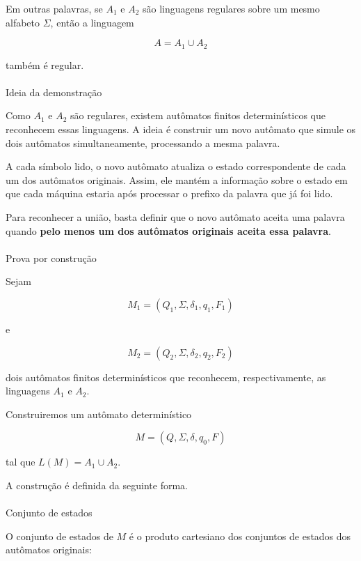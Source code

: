 \documentclass[
  brazilian,
  letterpaper,
]{book}
\makeatletter
\let\oldparagraph\paragraph
\renewcommand{\paragraph}{
    \@ifstar
      \xxxParagraphStar
      \xxxParagraphNoStar
  }
\newcommand{\xxxParagraphStar}[1]{\oldparagraph*{#1}\mbox{}}
\newcommand{\xxxParagraphNoStar}[1]{\oldparagraph{#1}\mbox{}}
\theoremstyle{plain}
\theoremstyle{definition}
\theoremstyle{remark}
\makeatother
\begin{document}
Em outras palavras, se \(A_1\) e \(A_2\) são linguagens regulares sobre
um mesmo alfabeto \(\Sigma\), então a linguagem

\[
A = A_1 \cup A_2
\]

também é regular.

\paragraph{Ideia da demonstração}\label{ideia-da-demonstrauxe7uxe3o}

Como \(A_1\) e \(A_2\) são regulares, existem autômatos finitos
determinísticos que reconhecem essas linguagens. A ideia é construir um
novo autômato que simule os dois autômatos simultaneamente, processando
a mesma palavra.

A cada símbolo lido, o novo autômato atualiza o estado correspondente de
cada um dos autômatos originais. Assim, ele mantém a informação sobre o
estado em que cada máquina estaria após processar o prefixo da palavra
que já foi lido.

Para reconhecer a união, basta definir que o novo autômato aceita uma
palavra quando \textbf{pelo menos um dos autômatos originais aceita essa
palavra}.

\paragraph{Prova por construção}\label{prova-por-construuxe7uxe3o-1}

Sejam

\[
M_1 = (Q_1, \Sigma, \delta_1, q_1, F_1)
\]

e

\[
M_2 = (Q_2, \Sigma, \delta_2, q_2, F_2)
\]

dois autômatos finitos determinísticos que reconhecem, respectivamente,
as linguagens \(A_1\) e \(A_2\).

Construiremos um autômato determinístico

\[
M = (Q, \Sigma, \delta, q_0, F)
\]

tal que \(L(M) = A_1 \cup A_2\).

A construção é definida da seguinte forma.

\paragraph{Conjunto de estados}\label{conjunto-de-estados}

O conjunto de estados de \(M\) é o produto cartesiano dos conjuntos de
estados dos autômatos originais:
\end{document}
